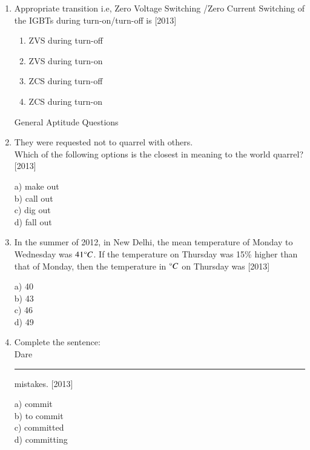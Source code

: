 \documentclass[journal]{IEEEtran}
\begin{document}
\begin{enumerate}[start=53]
 \item Appropriate transition i.e, Zero Voltage Switching /Zero Current Switching  of the IGBTs during turn-on/turn-off is \hfill{[2013]}
 \begin{enumerate}
     \item ZVS during turn-off\\
     \item ZVS during turn-on\\
     \item ZCS during turn-off\\
     \item ZCS during turn-on
 \end{enumerate}
 General Aptitude  Questions
\item They were requested not to quarrel with others.\\
Which of the following options is the closest in meaning to the world quarrel? 
\hfill{[2013]}
\begin{multicols}{4}
    a) make out\\
    b) call out\\
    c) dig out\\
    d) fall out
\end{multicols}

\item In the summer of 2012, in New Delhi, the mean temperature of Monday to Wednesday was $41\degree C$. If the temperature on Thursday was 15\% higher than that of Monday, then the temperature in $\degree C$ on Thursday was  \hfill{[2013]}
\begin{multicols}{4}
    a) 40\\
    b) 43\\
    c) 46\\
    d) 49
\end{multicols}
\item Complete the sentence:\\
Dare \rule{1in}{0.4pt} mistakes.
\hfill{[2013]}
\begin{multicols}{4}
    a) commit\\
    b) to commit\\
    c) committed\\
    d) committing
\end{multicols}


\end{enumerate}
\end{document}
